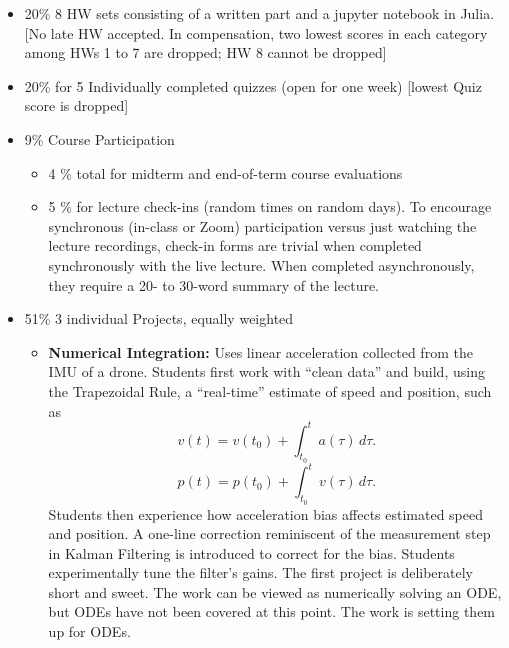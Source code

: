 \documentclass[letterpaper]{book}
\begin{document}
\begin{itemize}
    \item 20\% 8 HW sets consisting of a written part and a jupyter notebook in Julia. [No late HW accepted. In compensation, two lowest scores in each category among HWs 1 to 7 are dropped; HW 8 cannot be dropped]
    \item 20\% for 5 Individually completed quizzes (open for one week) [lowest Quiz score is dropped]
    \item 9\% Course Participation 
    \begin{itemize}
        \item 4 \% total for midterm and end-of-term course evaluations
        \item 5 \% for lecture check-ins (random times on random days). To encourage synchronous (in-class or Zoom) participation versus just watching the lecture recordings, check-in forms are trivial when completed synchronously with the live lecture. When completed asynchronously, they require a 20- to 30-word summary of the lecture.
    \end{itemize}
    \item 51\% 3 individual Projects, equally weighted
    \begin{itemize}
        \item \textbf{Numerical Integration:} Uses linear acceleration collected from the IMU of a drone. Students first work with ``clean data'' and build, using the Trapezoidal Rule, a ``real-time'' estimate of speed and position, such as
        $$ v(t) = v(t_0) + \int_{t_0}^t a(\tau) \, d \tau.$$    
        $$ p(t) = p(t_0) + \int_{t_0}^t v(\tau) \, d \tau.$$   
        Students then experience how acceleration bias affects estimated speed and position. A one-line correction reminiscent of the measurement step in Kalman Filtering is introduced to correct for the bias. Students experimentally tune the filter's gains. The first project is deliberately short and sweet. The work can be viewed as numerically solving an ODE, but ODEs have not been covered at this point. The work is setting them up for ODEs. 

\end{itemize}
\end{itemize}
\end{document}
